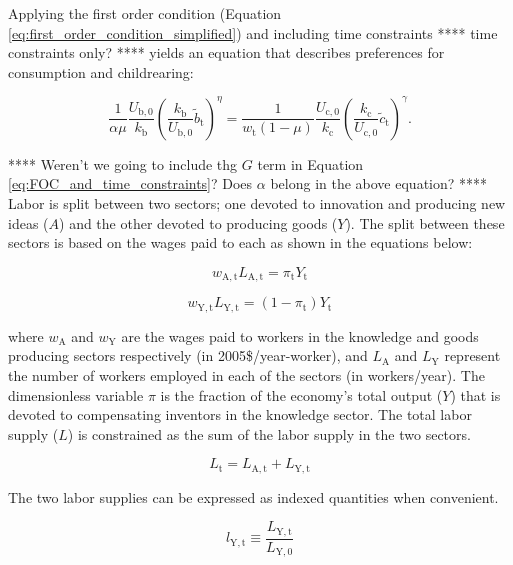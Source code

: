 \documentclass[letterpaper,12pt]{article}
\begin{document}
Applying the first order condition (Equation \ref{eq:first_order_condition_simplified}) and including time constraints **** time constraints only? **** yields an equation that describes preferences for consumption and childrearing:

\begin{equation} \label{eq:FOC_and_time_constraints}
	\frac{1}{\alpha \mu} \frac{U_\mathrm{b,0}}{k_\mathrm{b}} \left( \frac{k_\mathrm{b}}{U_\mathrm{b,0}} \tilde b_\mathrm{t} \right) ^{\eta} 
	= \frac{1}{w_\mathrm{t}(1-\mu)} \frac{U_\mathrm{c,0}}{k_\mathrm{c}}  \left( \frac{k_\mathrm{c}}{U_\mathrm{c,0}} \tilde c_\mathrm{t} \right)^\gamma .
\end{equation}

**** Weren't we going to include thg $G$ term in Equation \ref{eq:FOC_and_time_constraints}? Does $\alpha$ belong in the above equation? **** Labor is split between two sectors; one devoted to innovation and producing new ideas ($A$) and the other devoted to producing goods ($Y$). The split between these sectors is based on the wages paid to each as shown in the equations below:

\begin{equation} \label{eq:knowledge_comp}
	w_\mathrm{A,t} L_\mathrm{A,t} = \pi_\mathrm{t} Y_\mathrm{t}
\end{equation}

\begin{equation} \label{eq:labor_comp}
	w_\mathrm{Y,t} L_\mathrm{Y,t} = (1-\pi_\mathrm{t}) Y_\mathrm{t}
\end{equation}

\noindent where $w_\mathrm{A}$ and $w_\mathrm{Y}$ are the wages paid to workers in the knowledge and goods producing sectors respectively (in 2005\$/year-worker), and $L_\mathrm{A}$ and $L_\mathrm{Y}$ represent the number of workers employed in each of the sectors (in workers/year). The dimensionless variable $\pi$ is the fraction of the economy's total output ($Y$) that is devoted to compensating inventors in the knowledge sector. The total labor supply ($L$) is constrained as the sum of the labor supply in the two sectors.

\begin{equation} \label{eq:labor_supply}
	L_\mathrm{t} = L_\mathrm{A,t} + L_\mathrm{Y,t}
\end{equation}

The two labor supplies can be expressed as indexed quantities when convenient.

\begin{equation}
	l_\mathrm{Y,t} \equiv \frac{L_\mathrm{Y,t}}{L_\mathrm{Y,0}}
\end{equation}
\end{document}
